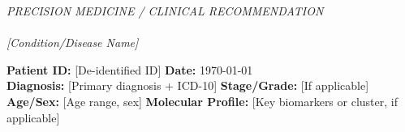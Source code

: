 \documentclass[10pt,letterpaper]{article}
\begin{document}
\begin{center}
{\small\textit{PRECISION MEDICINE / CLINICAL RECOMMENDATION}}\\[2pt]
{\Large\bfseries{}}\\[1pt]
{\normalsize\textit{[Condition/Disease Name]}}
\end{center}

\vspace{-8pt}

\begin{tcolorbox}[
    colback=lightgray,
    colframe=headerblue,
    boxrule=0.5pt,
    arc=2pt,
    left=4pt,right=4pt,top=3pt,bottom=3pt,
    fontupper=\small
]
\textbf{Patient ID:} [De-identified ID] \hfill \textbf{Date:} \today\\
\textbf{Diagnosis:} [Primary diagnosis + ICD-10] \hfill \textbf{Stage/Grade:} [If applicable]\\
\textbf{Age/Sex:} [Age range, sex] \hfill \textbf{Molecular Profile:} [Key biomarkers or cluster, if applicable]
\end{tcolorbox}

\vspace{4pt}
\end{document}
